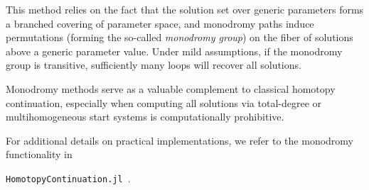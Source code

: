 This method relies on the fact that the solution set over generic parameters forms a branched covering of parameter space, and monodromy paths induce permutations (forming the so-called \emph{monodromy group}) on the fiber of solutions above a generic parameter value. Under mild assumptions, if the monodromy group is transitive, sufficiently many loops will recover all solutions.

Monodromy methods serve as a valuable complement to classical homotopy continuation, especially when computing all solutions via total-degree or multihomogeneous start systems is computationally prohibitive.

For additional details on practical implementations, we refer to the monodromy functionality in

\texttt{HomotopyContinuation.jl}~\cite{HomotopyContinuationJL}.

